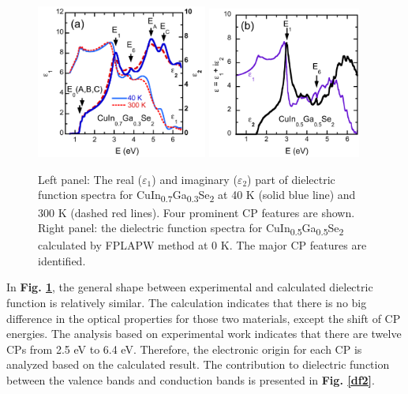 \documentclass[a4paper, 12pt, titlepage,oneside,drop]{kthesis}
\begin{document}
 \begin{figure}[H]
    \begin{center}
            \includegraphics[width=0.5\textwidth]{APL1b.jpg}
            \includegraphics[width=0.45\textwidth]{APL1a.jpg}
     \end{center}
    \caption{Left panel: The real ($\varepsilon_1$) and imaginary ($\varepsilon_2$) part of dielectric function spectra for CuIn\textsubscript{0.7}Ga\textsubscript{0.3}Se\textsubscript{2} 
at 40 K (solid blue line) and 300 K (dashed red lines). Four prominent CP features are shown. Right panel: the dielectric function spectra for CuIn\textsubscript{0.5}Ga\textsubscript{0.5}Se\textsubscript{2}
calculated by FPLAPW method at 0 K. The major CP features are identified. }
   \label{df1}
\end{figure}

In \textbf{Fig. \ref{df1}}, the general shape between experimental and calculated dielectric function is relatively similar. The calculation indicates that there is no big difference in the optical properties for those 
two materials, except the shift of CP energies. The analysis based on experimental work indicates that there are twelve CPs from 2.5 eV to 6.4 eV. Therefore, the electronic origin for each CP is analyzed based on 
the calculated result. The contribution to dielectric function between the valence bands and conduction bands is presented in \textbf{Fig. \ref{df2}}.
\end{document}
